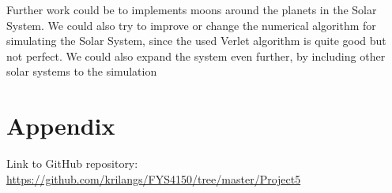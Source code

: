 \documentclass[12pt,a4paper,english]{article}
\begin{document}
Further work could be to implements moons around the planets in the Solar System. We could also try to improve or change the numerical algorithm for simulating the Solar System, since the used Verlet algorithm is quite good but not perfect. We could also expand the system even further, by including other solar systems to the simulation

\appendix
\section{Appendix}
\label{sect:appendix}
Link to GitHub repository:\\
\url{https://github.com/krilangs/FYS4150/tree/master/Project5}



\end{document}
